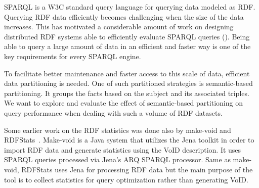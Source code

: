 \gls{SPARQL} is a \gls{W3C} standard query language for querying data modeled as \gls{RDF}.
Querying \gls{RDF} data efficiently becomes challenging when the size of the data increases.
This has motivated a considerable amount of work on designing distributed \gls{RDF} systems able to efficiently evaluate \gls{SPARQL} queries (\cite{Schatzle:2016:SRQ:2977797.2977806,sparqlgx-iswc-2016}).
Being able to query a large amount of data in an efficient and faster way is one of the key requirements for every \gls{SPARQL} engine.


To facilitate better maintenance and faster access to this scale of data, efficient data partitioning is needed.
One of such partitioned strategies is semantic-based partitioning. 
It groups the facts based on the subject and its associated triples.
We want to explore and evaluate the effect of semantic-based partitioning on query performance when dealing with such a volume of \gls{RDF} datasets.



Some earlier work on the \gls{RDF} statistics was done also by make-void and RDFStats~\cite{conf/dexaw/LangeggerW09}.
Make-void is a Java system that utilizes the Jena toolkit in order to import \gls{RDF} data and generate statistics using the VoID description. 
It uses \gls{SPARQL} queries processed via Jena's ARQ \gls{SPARQL} processor.
Same as make-void, RDFStats uses Jena for processing \gls{RDF} data but the main purpose of the tool is to collect statistics for query optimization rather than generating VoID.